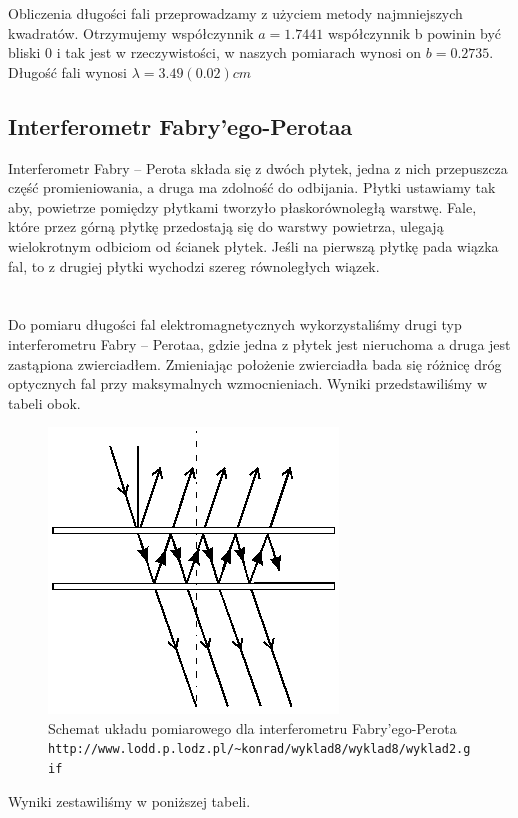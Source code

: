 \documentclass[a4paper]{article}
\newlength{\du}
\begin{document}
Obliczenia długości fali przeprowadzamy z użyciem metody najmniejszych kwadratów. Otrzymujemy współczynnik $a = 1.7441$ współczynnik b powinin być bliski 0 i tak jest w rzeczywistości, w naszych pomiarach wynosi on $b=0.2735$. Długość fali wynosi $\lambda = 3.49(0.02)cm$


\subsection{Interferometr Fabry'ego-Perotaa}
Interferometr Fabry – Perota składa się z dwóch płytek, jedna z nich przepuszcza część promieniowania, a druga ma zdolność do odbijania. Płytki ustawiamy tak aby, powietrze pomiędzy płytkami tworzyło płaskorównoległą warstwę. Fale, które przez górną płytkę przedostają się do warstwy powietrza, ulegają wielokrotnym odbiciom od ścianek płytek. Jeśli na pierwszą płytkę pada wiązka fal, to z drugiej płytki wychodzi szereg równoległych wiązek. 
\\
\\
\\
Do pomiaru długości fal elektromagnetycznych wykorzystaliśmy drugi typ interferometru Fabry – Perotaa, gdzie jedna z płytek jest nieruchoma a druga jest zastąpiona zwierciadłem. Zmieniając położenie zwierciadła bada się różnicę dróg optycznych fal przy maksymalnych wzmocnieniach. Wyniki przedstawiliśmy w tabeli obok.

\begin{figure}[h!]
\centering
\includegraphics[scale=0.7]{fabry_perot.png}
\caption{Schemat układu pomiarowego dla interferometru Fabry'ego-Perota \texttt{http://www.lodd.p.lodz.pl/\textasciitilde konrad/wyklad8/wyklad8/wyklad2.gif}}
\label{Fabry'ego_Perota}
\end{figure}

Wyniki zestawiliśmy w poniższej tabeli. 
\end{document}
